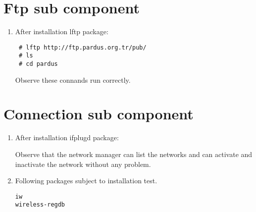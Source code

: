 \documentclass[a4paper,10pt]{article}
\begin{document}
\section{Ftp sub component}
\begin{enumerate}
 \item After installation lftp package:
\begin{verbatim}
 # lftp http://ftp.pardus.org.tr/pub/
 # ls 
 # cd pardus
\end{verbatim}
Observe these connands run correctly.

\end{enumerate}

\section{Connection sub component}
\begin{enumerate}
\item After installation ifplugd package:

Observe that the network manager can list the networks and can activate and inactivate the network without any problem.

 \item Following packages subject to installation test.
\begin{verbatim}
iw
wireless-regdb
\end{verbatim}


\end{enumerate}
\end{document}
